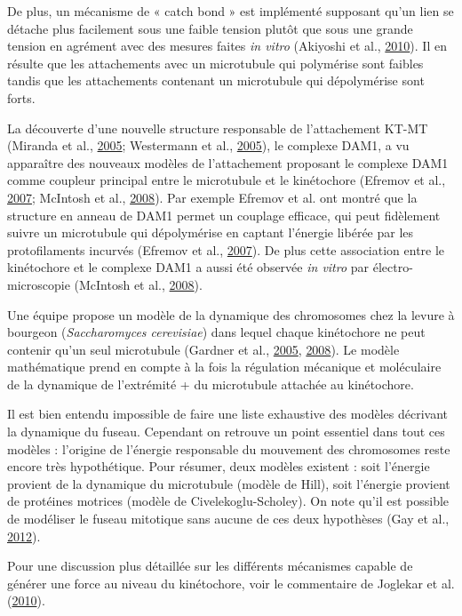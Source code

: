 \documentclass[12pt,a4paper,twoside,openright]{book}
\begin{document}
De plus, un mécanisme de « catch bond » est implémenté supposant qu'un
lien se détache plus facilement sous une faible tension plutôt que sous
une grande tension en agrément avec des mesures faites \emph{in vitro}
(Akiyoshi et al., \hyperref[ref-Akiyoshi2010]{2010}). Il en résulte que
les attachements avec un microtubule qui polymérise sont faibles tandis
que les attachements contenant un microtubule qui dépolymérise sont
forts.

La découverte d'une nouvelle structure responsable de l'attachement
KT-MT (Miranda et al., \hyperref[ref-Miranda2005]{2005}; Westermann et
al., \hyperref[ref-Westermann2005]{2005}), le complexe DAM1, a vu
apparaître des nouveaux modèles de l'attachement proposant le complexe
DAM1 comme coupleur principal entre le microtubule et le kinétochore
(Efremov et al., \hyperref[ref-Efremov2007]{2007}; McIntosh et al.,
\hyperref[ref-McIntosh2008]{2008}). Par exemple Efremov et al. ont
montré que la structure en anneau de DAM1 permet un couplage efficace,
qui peut fidèlement suivre un microtubule qui dépolymérise en captant
l'énergie libérée par les protofilaments incurvés (Efremov et al.,
\hyperref[ref-Efremov2007]{2007}). De plus cette association entre le
kinétochore et le complexe DAM1 a aussi été observée \emph{in vitro} par
électro-microscopie (McIntosh et al.,
\hyperref[ref-McIntosh2008]{2008}).

Une équipe propose un modèle de la dynamique des chromosomes chez la
levure à bourgeon (\emph{Saccharomyces cerevisiae}) dans lequel chaque
kinétochore ne peut contenir qu'un seul microtubule (Gardner et al.,
\hyperref[ref-Gardner2005]{2005}, \hyperref[ref-Gardner2008a]{2008}). Le
modèle mathématique prend en compte à la fois la régulation mécanique et
moléculaire de la dynamique de l'extrémité + du microtubule attachée au
kinétochore.

Il est bien entendu impossible de faire une liste exhaustive des modèles
décrivant la dynamique du fuseau. Cependant on retrouve un point
essentiel dans tout ces modèles : l'origine de l'énergie responsable du
mouvement des chromosomes reste encore très hypothétique. Pour résumer,
deux modèles existent : soit l'énergie provient de la dynamique du
microtubule (modèle de Hill), soit l'énergie provient de protéines
motrices (modèle de Civelekoglu-Scholey). On note qu'il est possible de
modéliser le fuseau mitotique sans aucune de ces deux hypothèses (Gay et
al., \hyperref[ref-Gay2012a]{2012}).

Pour une discussion plus détaillée sur les différents mécanismes capable
de générer une force au niveau du kinétochore, voir le commentaire de
Joglekar et al. (\hyperref[ref-Joglekar2010a]{2010}).
\end{document}
